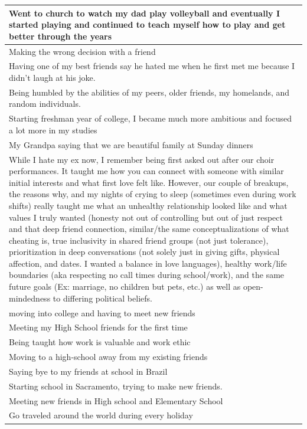 \documentclass[
  .7em,
  letterpaper,
  DIV=11,
  numbers=noendperiod]{scrartcl}
\begin{document}
\begin{table}
\begin{tabular}{l}
\hline
Went to church to watch my dad play volleyball and eventually I started playing and continued to teach myself how to play and get better through the years\\
\hline
Making the wrong decision with a friend\\
\hline
Having one of my best friends say he hated me when he first met me because I didn't laugh at his joke.\\
\hline
Being humbled by the abilities of my peers, older friends, my homelands, and random individuals.\\
\hline
Starting freshman year of college, I became much more ambitious and focused a lot more in my studies\\
\hline
My Grandpa saying that we are beautiful family at Sunday dinners\\
\hline
While I hate my ex now, I remember being first asked out after our choir performances. It taught me how you can connect with someone with similar initial interests and what first love felt like. However, our couple of breakups, the reasons why, and my nights of crying to sleep (sometimes even during work shifts) really taught me what an unhealthy relationship looked like and what values I truly wanted (honesty not out of controlling but out of just respect and that deep friend connection, similar/the same conceptualizations of what cheating is, true inclusivity in shared friend groups (not just tolerance), prioritization in deep conversations (not solely just in giving gifts, physical affection, and dates. I wanted a balance in love languages), healthy work/life boundaries (aka respecting no call times during school/work), and the same future goals (Ex: marriage, no children but pets, etc.) as well as open-mindedness to differing political beliefs.\\
\hline
moving into college and having to meet new friends\\
\hline
Meeting my High School friends for the first time\\
\hline
Being taught how work is valuable and work ethic\\
\hline
Moving to a high-school away from my existing friends\\
\hline
Saying bye to my friends at school in Brazil\\
\hline
Starting school in Sacramento, trying to make new friends.\\
\hline
Meeting new friends in High school and Elementary School\\
\hline
Go traveled around the world during every holiday\\

\end{tabular}
\end{table}
\end{document}
